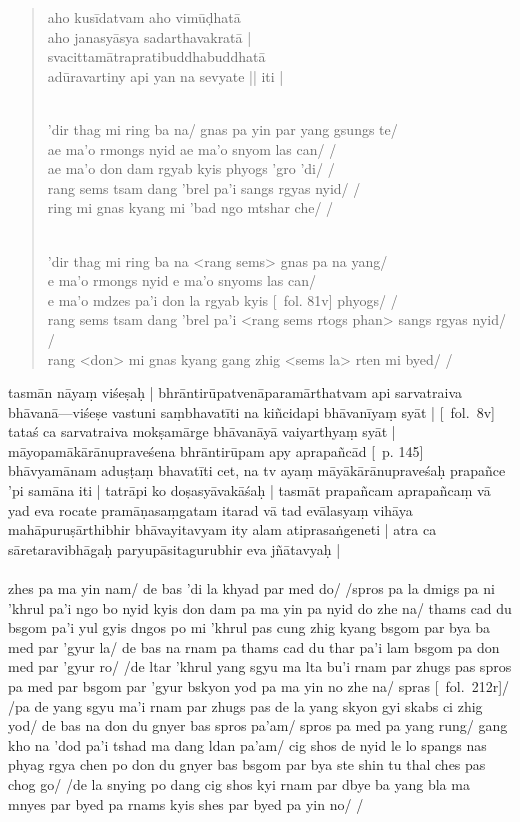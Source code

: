 \documentclass[12pt]{article}
\newcommand{\emdash} {\hspace{0em}—\hspace{0em}}
\begin{document}
\begin{quote}
	aho kusīdatvam aho vimūḍhatā\\
	aho janasyāsya sadarthavakratā |\\
	svacittamātrapratibuddhabuddhatā\\
	adūravartiny api yan na sevyate || iti |

	\textbf{\TVA}\\
	'dir thag mi ring ba na/ gnas pa yin par yang gsungs te/\\
	ae ma'o rmongs nyid ae ma'o snyom las can/ /\\
	ae ma'o don dam rgyab kyis phyogs 'gro 'di/ /\\
	rang sems tsam dang 'brel pa'i sangs rgyas nyid/ /\\
	ring mi gnas kyang mi 'bad ngo mtshar che/ /

	\textbf{\TVB}\\
	'dir thag mi ring ba na <rang sems> gnas pa na yang/\\
	e ma'o rmongs nyid e ma'o snyoms las can/\\
	e ma'o mdzes pa'i don la rgyab kyis [\TVB\ fol. 81v] phyogs/ /\\
	rang sems tsam dang 'brel pa'i <rang sems rtogs phan> sangs rgyas nyid/ /\\
	rang <don> mi gnas kyang gang zhig <sems la> rten mi byed/ /
\end{quote}

tasmān nāyaṃ viśeṣaḥ | bhrāntirūpatvenāparamārthatvam api sarvatraiva bhāvanā\emdash viśeṣe vastuni saṃbhavatīti na kiñcidapi bhāvanīyaṃ syāt | [\MS\ fol.\ 8v] tataś ca sarvatraiva mokṣamārge bhāvanāyā vaiyarthyaṃ syāt | māyopamākārānupraveśena bhrāntirūpam apy aprapañcād [\EDD\ p. 145] bhāvyamānam aduṣṭaṃ bhavatīti cet, na tv ayaṃ māyākārānupraveśaḥ prapañce 'pi samāna iti | tatrāpi ko doṣasyāvakāśaḥ | tasmāt prapañcam aprapañcaṃ vā yad eva rocate pramāṇasaṃgatam itarad vā tad evālasyaṃ vihāya mahāpuruṣārthibhir bhāvayitavyam ity alam atiprasaṅgeneti | atra ca sāretaravibhāgaḥ paryupāsitagurubhir eva jñātavyaḥ |\\

\textbf{\TVA}\\
zhes pa ma yin nam/ de bas 'di la khyad par med do/ /spros pa la dmigs pa ni 'khrul pa'i ngo bo nyid kyis don dam pa ma yin pa nyid do zhe na/ thams cad du bsgom pa'i yul gyis dngos po mi 'khrul pas cung zhig kyang bsgom par bya ba med par 'gyur la/ de bas na rnam pa thams cad du thar pa'i lam bsgom pa don med par 'gyur ro/ /de ltar 'khrul yang sgyu ma lta bu'i rnam par zhugs pas spros pa med par bsgom par 'gyur bskyon yod pa ma yin no zhe na/ spras [\TVA\ fol.\ 212r]/ /pa de yang sgyu ma'i rnam par zhugs pas de la yang skyon gyi skabs ci zhig yod/ de bas na don du gnyer bas spros pa'am/ spros pa med pa yang rung/ gang kho na 'dod pa'i tshad ma dang ldan pa'am/ cig shos de nyid le lo spangs nas phyag rgya chen po don du gnyer bas bsgom par bya ste shin tu thal ches pas chog go/ /de la snying po dang cig shos kyi rnam par dbye ba yang bla ma mnyes par byed pa rnams kyis shes par byed pa yin no/ /\\
\end{document}
